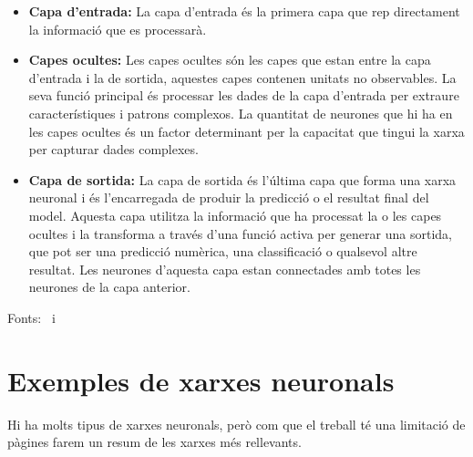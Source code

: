\begin{itemize}
    \item \textbf{Capa d'entrada:} La capa d'entrada és la primera capa que rep directament la informació que es processarà.
    \item \textbf{Capes ocultes:} Les capes ocultes són les capes que estan entre la capa d'entrada i la de sortida, aquestes capes contenen unitats no observables. La seva funció principal és processar les dades de la capa d'entrada per extraure característiques i patrons complexos. La quantitat de neurones que hi ha en les capes ocultes és un factor determinant per la capacitat que tingui la xarxa per capturar dades complexes.
    \item \textbf{Capa de sortida:} La capa de sortida és l'última capa que forma una xarxa neuronal i és l'encarregada de produir la predicció o el resultat final del model. Aquesta capa utilitza la informació que ha processat la o les capes ocultes i la transforma a través d'una funció activa per generar una sortida, que pot ser una predicció numèrica, una classificació o qualsevol altre resultat. Les neurones d'aquesta capa estan connectades amb totes les neurones de la capa anterior.
\end{itemize}

Fonts:~\cite{Hidden_layer} i~\cite{linkedin}

\section{Exemples de xarxes neuronals}

Hi ha molts tipus de xarxes neuronals, però com que el treball té una limitació de pàgines farem un resum de les xarxes més rellevants.

